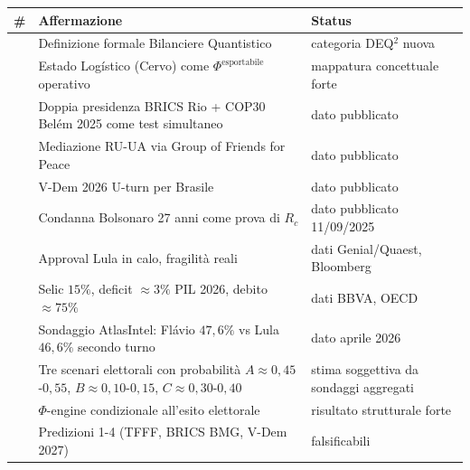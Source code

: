 {\def\LTcaptype{none} %
{\small\begin{longtable}[]{@{}
  >{\raggedright\arraybackslash}p{}
  >{\raggedright\arraybackslash}p{}
  >{\raggedright\arraybackslash}p{}@{}}
\toprule\noalign{}
\begin{minipage}[b]{\linewidth}\raggedright
\#
\end{minipage} & \begin{minipage}[b]{\linewidth}\raggedright
Affermazione
\end{minipage} & \begin{minipage}[b]{\linewidth}\raggedright
Status
\end{minipage} \\
\midrule\noalign{}
\endhead
\bottomrule\noalign{}
\endlastfoot
1 & Definizione formale Bilanciere Quantistico & \Hypoth{} categoria
DEQ$^2$ nuova \\
2 & Estado Logístico (Cervo) come \(\Phi^{\text{esportabile}}\)
operativo & \Hypoth{} mappatura concettuale forte \\
3 & Doppia presidenza BRICS Rio + COP30 Belém 2025 come test simultaneo
& \Proved{} dato pubblicato \\
4 & Mediazione RU-UA via Group of Friends for Peace & \Proved{} dato
pubblicato \\
5 & V-Dem 2026 U-turn per Brasile & \Proved{} dato pubblicato \\
6 & Condanna Bolsonaro 27 anni come prova di \(R_c\) & \Proved{} dato
pubblicato 11/09/2025 \\
7 & Approval Lula in calo, fragilità reali & \Proved{} dati
Genial/Quaest, Bloomberg \\
8 & Selic \(15\%\), deficit \(\approx 3\%\) PIL 2026, debito
\(\approx 75\%\) & \Proved{} dati BBVA, OECD \\
9 & Sondaggio AtlasIntel: Flávio \(47{,}6\%\) vs Lula \(46{,}6\%\)
secondo turno & \Proved{} dato aprile 2026 \\
10 & Tre scenari elettorali con probabilità
\(A \approx 0{,}45\)-\(0{,}55\), \(B \approx 0{,}10\)-\(0{,}15\),
\(C \approx 0{,}30\)-\(0{,}40\) & \Conj{} stima soggettiva da sondaggi
aggregati \\
11 & \(\Phi\)-engine condizionale all'esito elettorale & \Hypoth{}
risultato strutturale forte \\
12 & Predizioni 1-4 (TFFF, BRICS BMG, V-Dem 2027) & \Conj{}
falsificabili \\
\end{longtable}}
}



